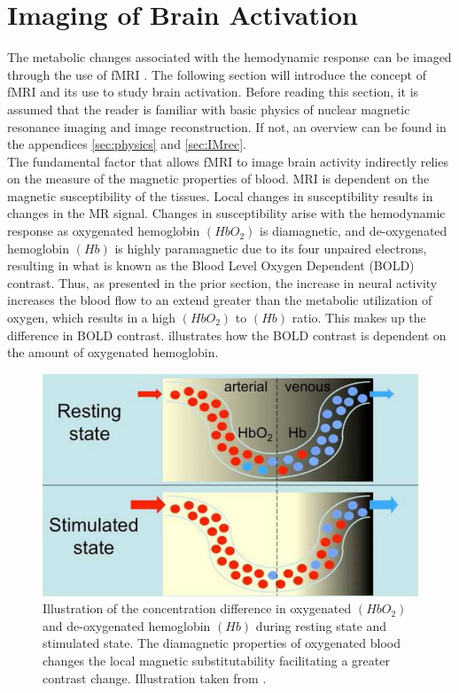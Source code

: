 
\section{Imaging of Brain Activation}

The metabolic changes associated with the hemodynamic response can be imaged through the use of fMRI \cite{Glover2011}. The following section will introduce the concept of fMRI and its use to study brain activation. Before reading this section, it is assumed that the reader is familiar with basic physics of nuclear magnetic resonance imaging and image reconstruction. If not, an overview can be found in the appendices \ref{sec:physics} and \ref{sec:IMrec}. \\
The fundamental factor that allows fMRI to image brain activity indirectly relies on the measure of the magnetic properties of blood. MRI is dependent on the magnetic susceptibility of the tissues. Local changes in susceptibility results in changes in the MR signal. \cite{Syed2015} Changes in susceptibility arise with the hemodynamic response as oxygenated hemoglobin $(HbO_2)$ is diamagnetic, and de-oxygenated hemoglobin $(Hb)$ is highly paramagnetic due to its four unpaired electrons, resulting in what is known as the Blood Level Oxygen Dependent (BOLD) contrast. Thus, as presented in the prior section, the increase in neural activity increases the blood flow to an extend greater than the metabolic utilization of oxygen, which results in a high $(HbO_2)$ to $(Hb)$ ratio. This makes up the difference in BOLD contrast. \cite{Glover2011,Poldrack2011,Khanna2015}  illustrates how the BOLD contrast is dependent on the amount of oxygenated hemoglobin. 

\begin{figure}[H]                 
	\includegraphics[width=.47\textwidth]{figures/aBackground/bold_response}  
	\caption{Illustration of the concentration difference in oxygenated $(HbO_2)$ and de-oxygenated hemoglobin $(Hb)$ during resting state and stimulated state. The diamagnetic properties of oxygenated blood changes the local magnetic substitutability facilitating a greater contrast change. Illustration taken from \cite{Glover2011}.}
	\label{fig:back:bold} 
\end{figure}

